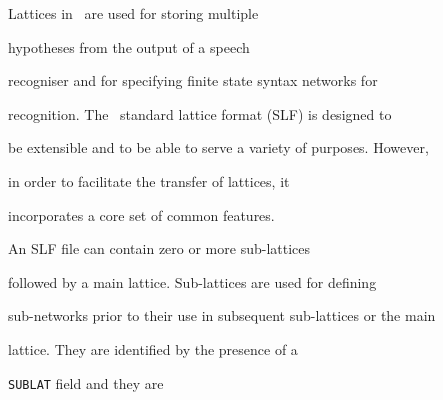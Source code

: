 













%

















Lattices in \HTK\ are used for storing multiple


hypotheses from the output of a speech


recogniser and for specifying finite state syntax networks for


recognition.  The \HTK\ standard lattice format (SLF) is designed to


be extensible and to be able to serve a variety of purposes.  However,


in order to facilitate the transfer of lattices, it


incorporates a core set of common features.





An SLF file can contain zero or more sub-lattices


followed by a main lattice.  Sub-lattices are used for defining


sub-networks prior to their use in subsequent sub-lattices or the main


lattice.  They are identified by the presence of a


\texttt{SUBLAT} field and they are


